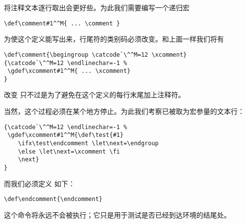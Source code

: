 \documentclass[letterpaper]{book}
\begin{document}
将注释文本逐行取出会更好些。为此我们需要编写一个递归宏
\begin{verbatim}
\def\comment#1^^M{ ... \comment }
\end{verbatim}
为使这个定义能写出来，行尾符的类别码必须改变。和上面一样我们将有
\begin{verbatim}
\def\comment{\begingroup \catcode`\^^M=12 \xcomment}
{\catcode`\^^M=12 \endlinechar=-1 %
 \gdef\xcomment#1^^M{ ... \xcomment}
}
\end{verbatim}
改变  只不过是为了避免在这个定义的每行末尾加上注释符。

当然，这个过程必须在某个地方停止。为此我们考察已被取为宏参量的文本行：
\begin{verbatim}
{\catcode`\^^M=12 \endlinechar=-1 %
 \gdef\xcomment#1^^M{\def\test{#1}
    \ifx\test\endcomment \let\next=\endgroup
    \else \let\next=\xcomment \fi
    \next}
}
\end{verbatim}
而我们必须定义  如下：
\begin{verbatim}
\def\endcomment{\endcomment}
\end{verbatim}
这个命令将永远不会被执行；它只是用于测试是否已经到达环境的结尾处。
\end{document}
